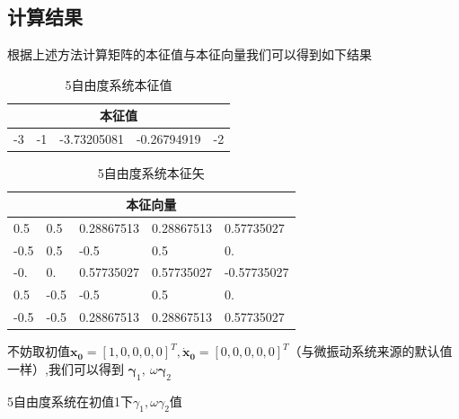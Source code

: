 \documentclass[11pt, a4paper, oneside]{ctexart}
\begin{document}
{{{\subsection{计算结果}
{
    


根据上述方法计算矩阵的本征值与本征向量我们可以得到如下结果

\begin{table}[h]
    \centering
    \caption{5自由度系统本征值}
    \begin{tabular}{@{}p{2cm}<{\centering}p{2cm}<{\centering}p{2cm}<{\centering}p{2cm}<{\centering}p{2cm}<{\centering}@{}}
    \toprule
    \multicolumn{5}{c}{本征值}                  \\ \midrule
    -3 & -1 & -3.73205081 & -0.26794919 & -2 \\ \bottomrule
    \end{tabular}
    \end{table}
\begin{table}[h]
    \caption{5自由度系统本征矢}
    \centering
    \begin{tabular}{@{}p{2cm}<{\centering}p{2cm}<{\centering}p{2cm}<{\centering}p{2cm}<{\centering}p{2cm}<{\centering}@{}}
    \toprule
    \multicolumn{5}{c}{本征向量}                              \\ \midrule
    {}0.5 & 0.5  & 0.28867513 & 0.28867513 & 0.57735027  \\
    -0.5   & 0.5  & -0.5       & 0.5        & 0.          \\ 
    -0.    & 0.   & 0.57735027 & 0.57735027 & -0.57735027 \\
    0.5    & -0.5 & -0.5       & 0.5        & 0.          \\
    -0.5   & -0.5 & 0.28867513 & 0.28867513 & 0.57735027  \\\bottomrule
    \end{tabular}
    \end{table}

    不妨取初值$\boldsymbol{x_0}=[1,0,0,0,0]^T,
    \boldsymbol{\dot x_0}=[0,0,0,0,0]^T
    $（与微振动系统来源的默认值一样）,我们可以得到
    $\boldsymbol\gamma_1,\ \omega\boldsymbol\gamma_2 $
\begin{table}[h]
    \centering
    \caption{5自由度系统在初值1下$\gamma_1,\omega\gamma_2值$}


\end{table}}}}}
\end{document}
